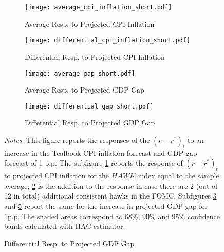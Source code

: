 \documentclass[11pt]{article}
\begin{document}
\begin{figure}[!htbp]\centering
  \begin{minipage}{.9\textwidth}
    \caption{Policy Response to Inflation and FOMC Hawkishness. Short Specification}\vspace{1ex}
    \label{fig:LP_short}
    \begin{subfigure}[b]{0.495\textwidth}
        \centering
        \caption{Average Resp. to Projected CPI Inflation}
        \label{fig:LP_short:average_inflation}
        \texttt{[image: average\_cpi\_inflation\_short.pdf]}
    \end{subfigure}
    \hfill
    \begin{subfigure}[b]{0.495\textwidth}
        \centering
        \caption{Differential  Resp. to Projected CPI Inflation}
        \label{fig:LP_short:differential_inflation}
        \texttt{[image: differential\_cpi\_inflation\_short.pdf]}
    \end{subfigure}\vspace{2ex}
    \begin{subfigure}[b]{0.495\textwidth}\centering
      \caption{Average Resp. to Projected GDP Gap}
      \label{fig:LP_short:average_gap}
      \texttt{[image: average\_gap\_short.pdf]}
    \end{subfigure} \hfill
    \begin{subfigure}[b]{0.495\textwidth}\centering
      \caption{Differential Resp. to Projected GDP Gap}
      \label{fig:LP_short:differential_gap}
      \texttt{[image: differential\_gap\_short.pdf]}
    \end{subfigure}
        {\begin{flushleft}\scriptsize\textit{Notes}: This figure reports the responses of the $(r-r^*)_t$ to an increase in the Tealbook CPI inflation forecast and GDP gap forecast of 1 p.p. The subfigure \ref{fig:LP_short:average_inflation} reports the response of $(r-r^*)_t$ to projected CPI inflation for the $\mathit{HAWK}$ index equal to the sample average; \ref{fig:LP_short:differential_inflation} is the addition to the response in case there are 2 (out of 12 in total) additional consistent hawks in the FOMC. Subfigures \ref{fig:LP_short:average_gap} and \ref{fig:LP_short:differential_gap} report the same for the increase in projected GDP gap for 1p.p. The shaded areas correspond to 68\%, 90\% and 95\% confidence bands calculated with \citet{Andrews1991} HAC estimator.\end{flushleft}}
            
  \end{minipage}
\end{figure}
\end{document}
